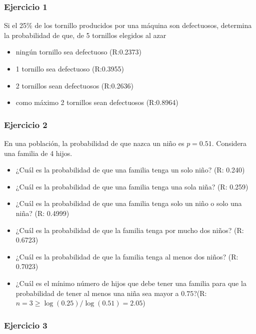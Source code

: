 \documentclass[
]{book}
\providecommand{\tightlist}{%
  \setlength{\itemsep}{0pt}\setlength{\parskip}{0pt}}
\begin{document}
\hypertarget{ejercicio-1-4}{%
\subsubsection{Ejercicio 1}\label{ejercicio-1-4}}

Si el 25\% de los tornillo producidos por una máquina son defectuosos, determina la probabilidad de que, de
5 tornillos elegidos al azar

\begin{itemize}
\tightlist
\item
  ningún tornillo sea defectuoso (R:0.2373)
\item
  1 tornillo sea defectuoso (R:0.3955)
\item
  2 tornillos sean defectuosos (R:0.2636)
\item
  como máximo 2 tornillos sean defectuosos (R:0.8964)
\end{itemize}

\hypertarget{ejercicio-2-4}{%
\subsubsection{Ejercicio 2}\label{ejercicio-2-4}}

En una población, la probabilidad de que nazca un niño es \(p=0.51\). Considera una familia de 4 hijos.

\begin{itemize}
\tightlist
\item
  ¿Cuál es la probabilidad de que una familia tenga un solo niño? (R: 0.240)
\item
  ¿Cuál es la probabilidad de que una familia tenga una sola niña? (R: 0.259)
\item
  ¿Cuál es la probabilidad de que una familia tenga solo un niño o solo una niña? (R: 0.4999)
\item
  ¿Cuál es la probabilidad de que la familia tenga por mucho dos niños? (R: 0.6723)
\item
  ¿Cuál es la probabilidad de que la familia tenga al menos dos niños? (R: 0.7023)
\item
  ¿Cuál es el mínimo número de hijos que debe tener una familia para que la probabilidad de tener al menos una niña sea mayor a \(0.75\)?(R:\(n=3 \geq\log(0.25)/\log(0.51)=2.05\))
\end{itemize}

\hypertarget{ejercicio-3-4}{%
\subsubsection{Ejercicio 3}\label{ejercicio-3-4}}
\end{document}
